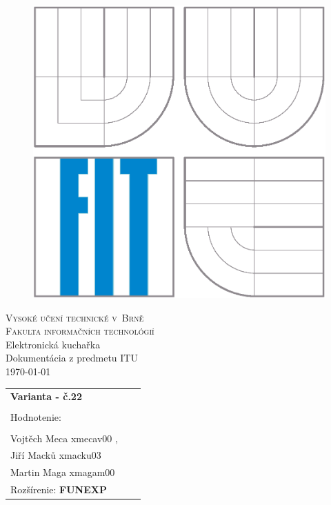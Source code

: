 \begin{titlepage}

\begin{figure}[h]
\begin{center}
\includegraphics[scale=0.6]{logo.eps}
\end{center}
\end{figure}

\begin{center}
\LARGE
\textsc{Vysoké učení
  technické v~Brně\\ \Large{Fakulta informačních technológií}}\\
\LARGE
Elektronická kuchařka \\
\Huge
Dokumentácia z predmetu ITU\\ 
\large{\medskip
\today }\\
\end{center}
 \hfill   

\begin{flushleft}
\begin{large}
\begin{tabular}{ll}
\textbf{Varianta - č.22} \\ \\
Hodnotenie: \\

 \\Vojtěch Meca   xmecav00 , \ \\ Jiří Macků  xmacku03 \\ Martin Maga xmagam00\\
Rozšírenie:
\textbf{FUNEXP} \\

\end{tabular}
\end{large}
\end{flushleft}
\end{titlepage}
